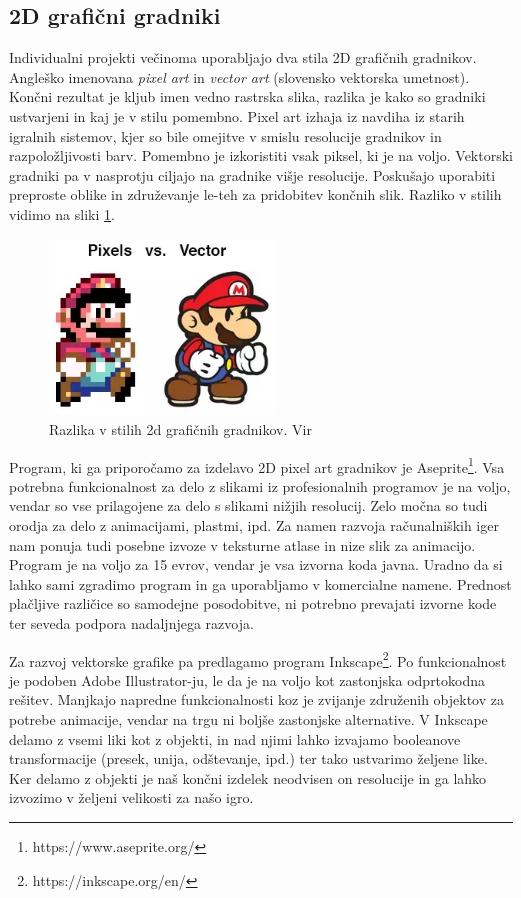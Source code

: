 \documentclass[12pt,a4paper,twoside]{book}
\begin{document}
\subsection{2D grafični gradniki}
Individualni projekti večinoma uporabljajo dva stila 2D grafičnih gradnikov. Angleško imenovana \textit{pixel art} in \textit{vector art} (slovensko vektorska umetnost). Končni rezultat je kljub imen vedno rastrska slika, razlika je kako so gradniki ustvarjeni in kaj je v stilu pomembno. Pixel art izhaja iz navdiha iz starih igralnih sistemov, kjer so bile omejitve v smislu resolucije gradnikov in razpoložljivosti barv. Pomembno je izkoristiti vsak piksel, ki je na voljo. Vektorski gradniki pa v nasprotju ciljajo na gradnike višje resolucije. Poskušajo uporabiti preproste oblike in združevanje le-teh za pridobitev končnih slik. Razliko v stilih vidimo na sliki \ref{slika:pixelVsVector}.

\begin{figure}[h]
	\centering
	\includegraphics[width=6cm]{pixelVsVector}
	\caption{Razlika v stilih 2d grafičnih gradnikov. Vir \cite{pixelVsVector}}
	\label{slika:pixelVsVector}
\end{figure}

Program, ki ga priporočamo za izdelavo 2D pixel art gradnikov je Aseprite\footnote{https://www.aseprite.org/}. Vsa potrebna funkcionalnost za delo z slikami iz profesionalnih programov je na voljo, vendar so vse prilagojene za delo s slikami nižjih resolucij. Zelo močna so tudi orodja za delo z animacijami, plastmi, ipd. Za namen razvoja računalniških iger nam ponuja tudi posebne izvoze v teksturne atlase in nize slik za animacijo. Program je na voljo za 15 evrov, vendar je vsa izvorna koda javna. Uradno da si lahko sami zgradimo program in ga uporabljamo v komercialne namene. Prednost plačljive različice so samodejne posodobitve, ni potrebno prevajati izvorne kode ter seveda podpora nadaljnjega razvoja.

Za razvoj vektorske grafike pa predlagamo program Inkscape\footnote{https://inkscape.org/en/}. Po funkcionalnost je podoben Adobe Illustrator-ju, le da je na voljo kot zastonjska odprtokodna rešitev. Manjkajo napredne funkcionalnosti koz je zvijanje združenih objektov za potrebe animacije, vendar na trgu ni boljše zastonjske alternative. V Inkscape delamo z vsemi liki kot z objekti, in nad njimi lahko izvajamo booleanove transformacije (presek, unija, odštevanje, ipd.) ter tako ustvarimo željene like. Ker delamo z objekti je naš končni izdelek neodvisen on resolucije in ga lahko izvozimo v željeni velikosti za našo igro. 
\end{document}
